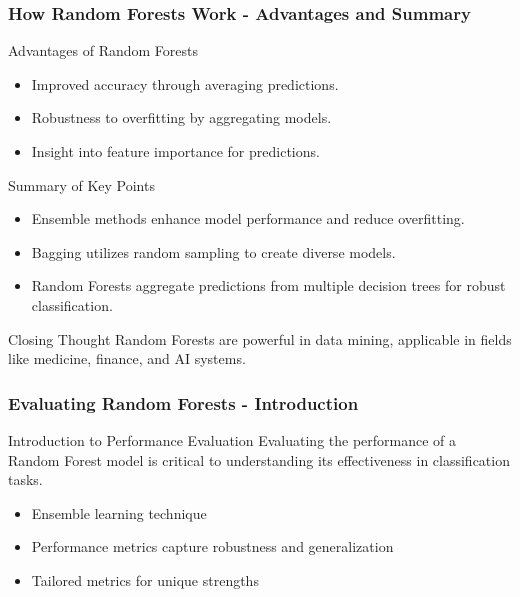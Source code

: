 \documentclass[aspectratio=169]{beamer}
\begin{document}
\begin{frame}[fragile]
    \frametitle{How Random Forests Work - Advantages and Summary}
    \begin{block}{Advantages of Random Forests}
        \begin{itemize}
            \item Improved accuracy through averaging predictions.
            \item Robustness to overfitting by aggregating models.
            \item Insight into feature importance for predictions.
        \end{itemize}
    \end{block}
    \begin{block}{Summary of Key Points}
        \begin{itemize}
            \item Ensemble methods enhance model performance and reduce overfitting.
            \item Bagging utilizes random sampling to create diverse models.
            \item Random Forests aggregate predictions from multiple decision trees for robust classification.
        \end{itemize}
    \end{block}
    \begin{block}{Closing Thought}
        Random Forests are powerful in data mining, applicable in fields like medicine, finance, and AI systems.
    \end{block}
\end{frame}

\begin{frame}[fragile]
    \frametitle{Evaluating Random Forests - Introduction}
    \begin{block}{Introduction to Performance Evaluation}
        Evaluating the performance of a Random Forest model is critical to understanding its effectiveness in classification tasks.
        \begin{itemize}
            \item Ensemble learning technique
            \item Performance metrics capture robustness and generalization
            \item Tailored metrics for unique strengths
        \end{itemize}
    \end{block}
\end{frame}
\end{document}

